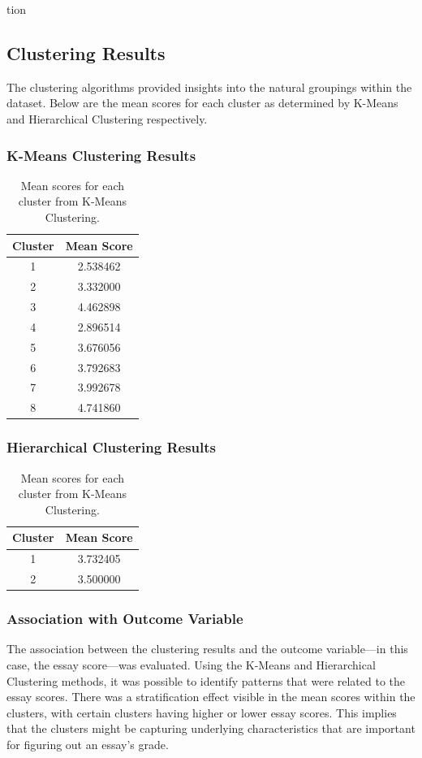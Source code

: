 tion\documentclass[8pt]{article}
\begin{document}
\begin{enumerate}
\subsection{Clustering Results}

The clustering algorithms provided insights into the natural groupings within the dataset. Below are the mean scores for each cluster as determined by K-Means and Hierarchical Clustering respectively.
\subsubsection{K-Means Clustering Results}
\begin{table}[H]
\centering
\begin{tabular}{cc}
\hline
\textbf{Cluster} & \textbf{Mean Score} \\
\hline
1 & 2.538462 \\
2 & 3.332000 \\
3 & 4.462898 \\
4 & 2.896514 \\
5 & 3.676056 \\
6 & 3.792683 \\
7 & 3.992678 \\
8 & 4.741860 \\
\hline
\end{tabular}
\caption{Mean scores for each cluster from K-Means Clustering.}
\label{table:hclust_scores}
\end{table}

\subsubsection{Hierarchical Clustering Results}
\begin{table}[H]
\centering
\begin{tabular}{cc}
\hline
\textbf{Cluster} & \textbf{Mean Score} \\
\hline
1 & 3.732405 \\
2 & 3.500000 \\
\hline
\end{tabular}
\caption{Mean scores for each cluster from K-Means Clustering.}
\label{table:kmeans_scores}
\end{table}

\subsubsection{Association with Outcome Variable}
The association between the clustering results and the outcome variable—in this case, the essay score—was evaluated. Using the K-Means and Hierarchical Clustering methods, it was possible to identify patterns that were related to the essay scores. There was a stratification effect visible in the mean scores within the clusters, with certain clusters having higher or lower essay scores. This implies that the clusters might be capturing underlying characteristics that are important for figuring out an essay's grade.


\end{enumerate}
\end{document}
